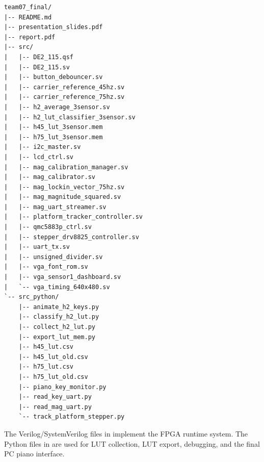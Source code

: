 \begin{lstlisting}[basicstyle=\ttfamily\footnotesize,columns=fixed,keepspaces=true]
team07_final/
|-- README.md
|-- presentation_slides.pdf
|-- report.pdf
|-- src/
|   |-- DE2_115.qsf
|   |-- DE2_115.sv
|   |-- button_debouncer.sv
|   |-- carrier_reference_45hz.sv
|   |-- carrier_reference_75hz.sv
|   |-- h2_average_3sensor.sv
|   |-- h2_lut_classifier_3sensor.sv
|   |-- h45_lut_3sensor.mem
|   |-- h75_lut_3sensor.mem
|   |-- i2c_master.sv
|   |-- lcd_ctrl.sv
|   |-- mag_calibration_manager.sv
|   |-- mag_calibrator.sv
|   |-- mag_lockin_vector_75hz.sv
|   |-- mag_magnitude_squared.sv
|   |-- mag_uart_streamer.sv
|   |-- platform_tracker_controller.sv
|   |-- qmc5883p_ctrl.sv
|   |-- stepper_drv8825_controller.sv
|   |-- uart_tx.sv
|   |-- unsigned_divider.sv
|   |-- vga_font_rom.sv
|   |-- vga_sensor1_dashboard.sv
|   `-- vga_timing_640x480.sv
`-- src_python/
    |-- animate_h2_keys.py
    |-- classify_h2_lut.py
    |-- collect_h2_lut.py
    |-- export_lut_mem.py
    |-- h45_lut.csv
    |-- h45_lut_old.csv
    |-- h75_lut.csv
    |-- h75_lut_old.csv
    |-- piano_key_monitor.py
    |-- read_key_uart.py
    |-- read_mag_uart.py
    `-- track_platform_stepper.py
\end{lstlisting}

The Verilog/SystemVerilog files in  implement the FPGA runtime system. The Python files in  are used for LUT collection, LUT export, debugging, and the final PC piano interface.

